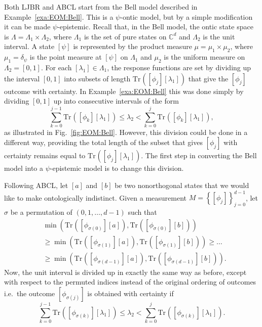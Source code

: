 \documentclass[DIV=calc,fontsize=12pt]{scrartcl} %
\theoremstyle{definition}
\theoremstyle{plain}
\newcommand{\Proj}[1]{\ensuremath{\left [ #1 \right ]}}
\newcommand{\Tr}[2][]{\ensuremath{\text{Tr}_{#1} \left ( #2 \right )}}
\begin{document}
Both LJBR and ABCL start from the Bell model described in
Example~\ref{exa:EOM:Bell}.  This is a $\psi$-ontic model, but by a
simple modification it can be made $\psi$-epistemic.  Recall that, in
the Bell model, the ontic state space is $\Lambda = \Lambda_1 \times
\Lambda_2$, where $\Lambda_1$ is the set of pure states on
$\mathbb{C}^d$ and $\Lambda_2$ is the unit interval.  A state
$\Proj{\psi}$ is represented by the product measure $\mu = \mu_1
\times \mu_2$, where $\mu_1 = \delta_{\psi}$ is the point
measure at $\Proj{\psi}$ on $\Lambda_1$ and $\mu_2$ is the uniform
measure on $\Lambda_2 = [0,1]$.  For each $[\lambda_1] \in \Lambda_1$,
the response functions are set by dividing up the interval $[0,1]$
into subsets of length $\Tr{\Proj{\phi_j}\Proj{\lambda_1}}$ that give
the $\Proj{\phi_j}$ outcome with certainty.  In
Example~\ref{exa:EOM:Bell} this was done simply by dividing $[0,1]$ up
into consecutive intervals of the form
\begin{equation}
\sum_{k=0}^{j-1} \Tr{\Proj{\phi_k}\Proj{\lambda_1}} \leq \lambda_2
< \sum_{k=0}^j \Tr{\Proj{\phi_k}\Proj{\lambda_1}},
\end{equation}
as illustrated in Fig.~\ref{fig:EOM:Bell}.  However, this division
could be done in a different way, providing the total length of the
subset that gives $\Proj{\phi_j}$ with certainty remains equal to
$\Tr{\Proj{\phi_j}\Proj{\lambda_1}}$.  The first step in converting
the Bell model into a $\psi$-epistemic model is to change this
division.

Following ABCL, let $\Proj{a}$ and $\Proj{b}$ be two nonorthogonal
states that we would like to make ontologically indistinct.  Given a
measurement $M = \left \{ \Proj{\phi_j} \right \}_{j=0}^{d-1}$, let
$\sigma$ be a permutation of $(0,1,\ldots,d-1)$ such that
\begin{align}
&\min \left ( \Tr{\Proj{\phi_{\sigma(0)}}\Proj{a}},
\Tr{\Proj{\phi_{\sigma(0)}}\Proj{b}} \right )\nonumber\\
& \geq \min \left ( \Tr{\Proj{\phi_{\sigma(1)}}\Proj{a}},
\Tr{\Proj{\phi_{\sigma(1)}}\Proj{b}} \right ) \geq \ldots \\
& \geq \min \left ( \Tr{\Proj{\phi_{\sigma(d-1)}}\Proj{a}},
\Tr{\Proj{\phi_{\sigma(d-1)}}\Proj{b}} \right ).
\end{align}
Now, the unit interval is divided up in exactly the same way as
before, except with respect to the permuted indices instead of the
original ordering of outcomes i.e.\ the outcome
$\Proj{\phi_{\sigma(j)}}$ is obtained with certainty if
\begin{equation}
\sum_{k=0}^{j-1} \Tr{\Proj{\phi_{\sigma(k)}}\Proj{\lambda_1}} \leq
\lambda_2 < \sum_{k=0}^j
\Tr{\Proj{\phi_{\sigma(k)}}\Proj{\lambda_1}}.
\end{equation}
\end{document}
